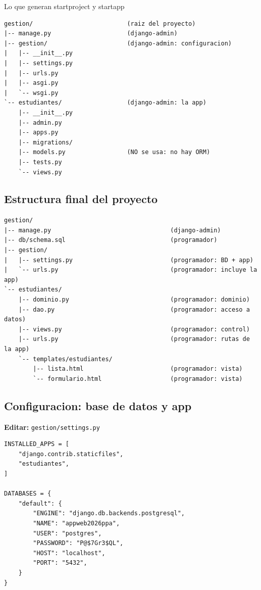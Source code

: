 \begin{cajaejemplo}{Lo que generan startproject y startapp}
\begin{lstlisting}[style=shell,caption={Esqueleto creado por django-admin},label={lst:dj-skel}]
gestion/                          (raiz del proyecto)
|-- manage.py                     (django-admin)
|-- gestion/                      (django-admin: configuracion)
|   |-- __init__.py
|   |-- settings.py
|   |-- urls.py
|   |-- asgi.py
|   `-- wsgi.py
`-- estudiantes/                  (django-admin: la app)
    |-- __init__.py
    |-- admin.py
    |-- apps.py
    |-- migrations/
    |-- models.py                 (NO se usa: no hay ORM)
    |-- tests.py
    `-- views.py
\end{lstlisting}
\end{cajaejemplo}

\subsection{Estructura final del proyecto}
\label{ap:crud:django:estructura}

\begin{lstlisting}[style=shell,caption={Estructura completa de la pista Django},label={lst:dj-tree}]
gestion/
|-- manage.py                                 (django-admin)
|-- db/schema.sql                             (programador)
|-- gestion/
|   |-- settings.py                           (programador: BD + app)
|   `-- urls.py                               (programador: incluye la app)
`-- estudiantes/
    |-- dominio.py                            (programador: dominio)
    |-- dao.py                                (programador: acceso a datos)
    |-- views.py                              (programador: control)
    |-- urls.py                               (programador: rutas de la app)
    `-- templates/estudiantes/
        |-- lista.html                        (programador: vista)
        `-- formulario.html                   (programador: vista)
\end{lstlisting}

\subsection{Configuracion: base de datos y app}
\label{ap:crud:django:settings}

{\small\textbf{Editar:} \texttt{gestion/settings.py}}
\begin{lstlisting}[style=python,caption={settings.py (conexion PostgreSQL y registro de la app)},label={lst:dj-settings}]
INSTALLED_APPS = [
    "django.contrib.staticfiles",
    "estudiantes",
]

DATABASES = {
    "default": {
        "ENGINE": "django.db.backends.postgresql",
        "NAME": "appweb2026ppa",
        "USER": "postgres",
        "PASSWORD": "P@$7Gr3$QL",
        "HOST": "localhost",
        "PORT": "5432",
    }
}
\end{lstlisting}

